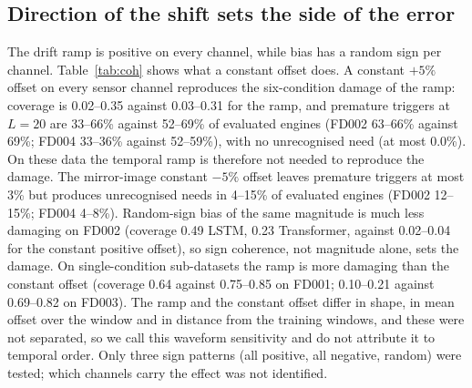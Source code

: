 \documentclass[11pt,a4paper]{article}
\newcommand{\NBiasEqL}{0.49}
\newcommand{\NBiasEqT}{0.23}
\newcommand{\JCohRampPICPSix}{0.03--0.31}
\newcommand{\JCohPosPICPSix}{0.02--0.35}
\newcommand{\JCohRampPremSix}{52--69}
\newcommand{\JCohPosPremSix}{33--66}
\newcommand{\JCohNegPremSixMax}{3}
\newcommand{\JCohNegUnrecSix}{4--15}
\newcommand{\JCohPosUnrecSixMax}{0.0}
\newcommand{\JCohRampPICPThree}{0.10--0.21}
\newcommand{\JCohPosPICPThree}{0.69--0.82}
\newcommand{\JCohRampPICPOne}{0.64}
\newcommand{\JCohPosPICPOne}{0.75--0.85}
\newcommand{\JCohRampPremFDtwo}{69}
\newcommand{\JCohPosPremFDtwo}{63--66}
\newcommand{\JCohRampPremFDfour}{52--59}
\newcommand{\JCohPosPremFDfour}{33--36}
\newcommand{\JCohPosPICPFDtwo}{0.02--0.04}
\newcommand{\JCohNegUnrecFDtwo}{12--15}
\newcommand{\JCohNegUnrecFDfour}{4--8}
\begin{document}
\subsection{Direction of the shift sets the side of the error}\label{sec:coherent}
The drift ramp is positive on every channel, while bias has a random sign per channel. Table~\ref{tab:coh} shows what a constant offset does. A constant $+5\%$ offset on every sensor channel reproduces the six-condition damage of the ramp: coverage is \JCohPosPICPSix{} against \JCohRampPICPSix{} for the ramp, and premature triggers at $L=20$ are \JCohPosPremSix\% against \JCohRampPremSix\% of evaluated engines (FD002 \JCohPosPremFDtwo\% against \JCohRampPremFDtwo\%; FD004 \JCohPosPremFDfour\% against \JCohRampPremFDfour\%), with no unrecognised need (at most \JCohPosUnrecSixMax\%). On these data the temporal ramp is therefore not needed to reproduce the damage. The mirror-image constant $-5\%$ offset leaves premature triggers at most \JCohNegPremSixMax\% but produces unrecognised needs in \JCohNegUnrecSix\% of evaluated engines (FD002 \JCohNegUnrecFDtwo\%; FD004 \JCohNegUnrecFDfour\%). Random-sign bias of the same magnitude is much less damaging on FD002 (coverage \NBiasEqL{} LSTM, \NBiasEqT{} Transformer, against \JCohPosPICPFDtwo{} for the constant positive offset), so sign coherence, not magnitude alone, sets the damage. On single-condition sub-datasets the ramp is more damaging than the constant offset (coverage \JCohRampPICPOne{} against \JCohPosPICPOne{} on FD001; \JCohRampPICPThree{} against \JCohPosPICPThree{} on FD003). The ramp and the constant offset differ in shape, in mean offset over the window and in distance from the training windows, and these were not separated, so we call this waveform sensitivity and do not attribute it to temporal order. Only three sign patterns (all positive, all negative, random) were tested; which channels carry the effect was not identified.
\end{document}
